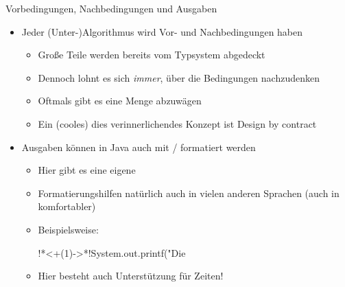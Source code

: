 \iffull
{\AddonFrame
\begin{frame}[fragile]{Vorbedingungen, Nachbedingungen und Ausgaben}
    \begin{itemize}[<+(1)->]
        \itemsep14pt
        \item Jeder (Unter-)Algorithmus wird Vor- und Nachbedingungen haben \begin{itemize}
            \item Große Teile werden bereits vom Typsystem abgedeckt
            \item Dennoch lohnt es sich \textit{immer}, über die Bedingungen nachzudenken
            \item Oftmals gibt es eine Menge abzuwägen
            \item Ein (cooles) dies verinnerlichendes Konzept ist Design by contract~\cite{meyer1986dbc,meyer1992applying}
        \end{itemize}
        \item Ausgaben können in Java auch mit / formatiert werden \begin{itemize}
            \item Hier gibt es eine eigene 
            \item Formatierungshilfen natürlich auch in vielen anderen Sprachen (auch in komfortabler)
            \item Beispielsweise:
\begin{plainjava}
!*\onslide<+(1)->*!System.out.printf("Die %
\end{plainjava}
            \item Hier besteht auch Unterstützung für Zeiten! 
        \end{itemize}
    \end{itemize}
\end{frame}
}\fi

